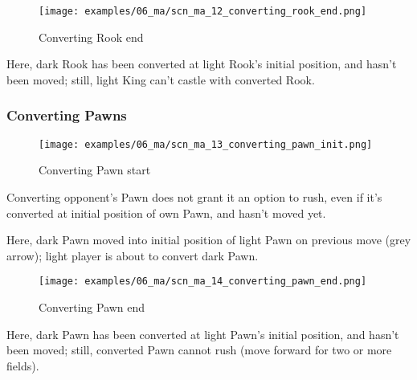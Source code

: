 \noindent
\begin{figure}[!h]
\texttt{[image: examples/06\_ma/scn\_ma\_12\_converting\_rook\_end.png]}
\caption{Converting Rook end}
\label{fig:scn_ma_12_converting_rook_end}
\end{figure}

Here, dark Rook has been converted at light Rook's initial position, and hasn't
been moved; still, light King can't castle with converted Rook.

\clearpage %

\subsubsection*{Converting Pawns}
\label{sec:Mayan Ascendancy/Pyramid/Conversion/Converting Pawns}

\vspace*{-1.1\baselineskip}
\noindent
\begin{figure}[!h]
\texttt{[image: examples/06\_ma/scn\_ma\_13\_converting\_pawn\_init.png]}
\caption{Converting Pawn start}
\label{fig:scn_ma_13_converting_pawn_init}
\end{figure}

Converting opponent's Pawn does not grant it an option to rush, even if it's
converted at initial position of own Pawn, and hasn't moved yet.

Here, dark Pawn moved into initial position of light Pawn on previous move
(grey arrow); light player is about to convert dark Pawn.

\clearpage %

\noindent
\begin{figure}[!h]
\texttt{[image: examples/06\_ma/scn\_ma\_14\_converting\_pawn\_end.png]}
\caption{Converting Pawn end}
\label{fig:scn_ma_14_converting_pawn_end}
\end{figure}

Here, dark Pawn has been converted at light Pawn's initial position, and hasn't
been moved; still, converted Pawn cannot rush (move forward for two or more fields).

\clearpage %

